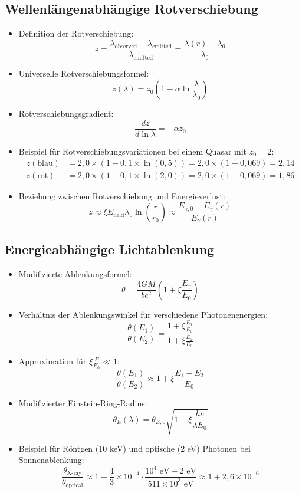 \documentclass[12pt,a4paper]{article}
\begin{document}
	\subsection{Wellenl\"{a}ngenabh\"{a}ngige Rotverschiebung}
	\begin{itemize}
		\item Definition der Rotverschiebung:
		$$z = \frac{\lambda_{\text{observed}} - \lambda_{\text{emitted}}}{\lambda_{\text{emitted}}} = \frac{\lambda(r) - \lambda_0}{\lambda_0}$$
		
		\item Universelle Rotverschiebungsformel:
		$$\boxed{z(\lambda) = z_0\left(1 - \alpha \ln\frac{\lambda}{\lambda_0}\right)}$$
		
		\item Rotverschiebungsgradient:
		$$\frac{dz}{d\ln\lambda} = -\alpha z_0$$
		
		\item Beispiel f\"{u}r Rotverschiebungsvariationen bei einem Quasar mit $z_0 = 2$:
		\begin{align*}
			z(\text{blau}) &= 2,0 \times (1 - 0,1 \times \ln(0,5)) = 2,0 \times (1 + 0,069) = 2,14\\
			z(\text{rot}) &= 2,0 \times (1 - 0,1 \times \ln(2,0)) = 2,0 \times (1 - 0,069) = 1,86
		\end{align*}
		
		\item Beziehung zwischen Rotverschiebung und Energieverlust:
		$$z \approx \xi E_{\text{field}} \lambda_0 \ln\left(\frac{r}{r_0}\right) \approx \frac{E_{\gamma,0} - E_\gamma(r)}{E_\gamma(r)}$$
	\end{itemize}
	
	\subsection{Energieabh\"{a}ngige Lichtablenkung}
	\begin{itemize}
		\item Modifizierte Ablenkungsformel:
		$$\boxed{\theta = \frac{4GM}{bc^2}\left(1 + \xi \frac{E_\gamma}{E_0}\right)}$$
		
		\item Verh\"{a}ltnis der Ablenkungswinkel f\"{u}r verschiedene Photonenenergien:
		$$\frac{\theta(E_1)}{\theta(E_2)} = \frac{1 + \xi \frac{E_1}{E_0}}{1 + \xi \frac{E_2}{E_0}}$$
		
		\item Approximation f\"{u}r $\xi \frac{E}{E_0} \ll 1$:
		$$\frac{\theta(E_1)}{\theta(E_2)} \approx 1 + \xi \frac{E_1 - E_2}{E_0}$$
		
		\item Modifizierter Einstein-Ring-Radius:
		$$\theta_E(\lambda) = \theta_{E,0} \sqrt{1 + \xi \frac{hc}{\lambda E_0}}$$
		
		\item Beispiel f\"{u}r R\"{o}ntgen (10 keV) und optische (2 eV) Photonen bei Sonnenablenkung:
		$$\frac{\theta_{\text{X-ray}}}{\theta_{\text{optical}}} \approx 1 + \frac{4}{3} \times 10^{-4} \cdot \frac{10^4 \text{ eV} - 2 \text{ eV}}{511 \times 10^3 \text{ eV}} \approx 1 + 2,6 \times 10^{-6}$$
	\end{itemize}
	
\end{document}
